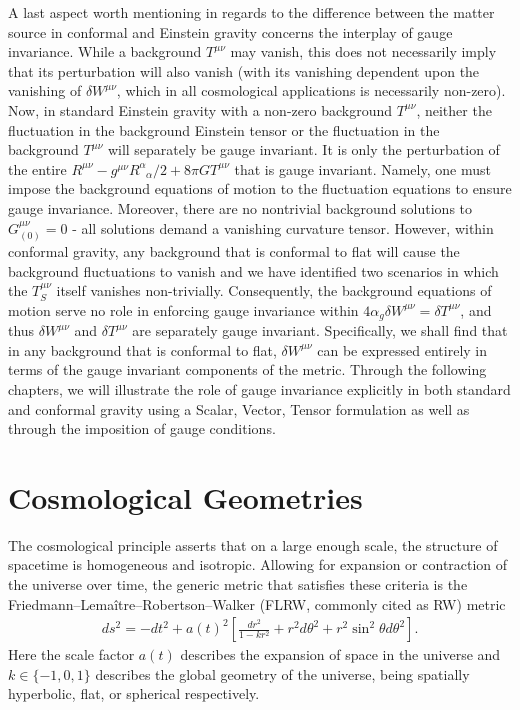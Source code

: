 A last aspect worth mentioning in regards to the difference between the matter source in conformal and Einstein gravity concerns the interplay of gauge invariance. While a background $T^{\mu\nu}$ may vanish, this does not necessarily imply that its perturbation will also vanish (with its vanishing dependent upon the vanishing of $\delta W^{\mu\nu}$, which in all cosmological applications is necessarily non-zero). Now, in standard Einstein gravity with a non-zero background $T^{\mu\nu}$, neither the fluctuation in the background Einstein tensor or the fluctuation in the background $T^{\mu\nu}$ will separately be gauge invariant. It is only the perturbation of the entire $R^{\mu\nu} -g^{\mu\nu}R^{\alpha}_{\phantom{\alpha}\alpha}/2+8\pi GT^{\mu\nu}$ that is gauge invariant. Namely, one must impose the background equations of motion to the fluctuation equations to ensure gauge invariance. Moreover, there are no nontrivial background solutions to $G^{\mu\nu}_{(0)}=0$ - all solutions demand a vanishing curvature tensor. However, within conformal gravity, any background that is conformal to flat will cause the background fluctuations to vanish and we have identified two scenarios in which the $T^{\mu\nu}_S$ itself vanishes non-trivially. Consequently, the background equations of motion serve no role in enforcing gauge invariance within $4\alpha_g\delta W^{\mu\nu} = \delta T^{\mu\nu}$, and thus $\delta W^{\mu\nu}$ and $\delta T^{\mu\nu}$ are separately gauge invariant.  Specifically, we shall find that in any background that is conformal to flat, $\delta W^{\mu\nu}$ can be expressed entirely in terms of the gauge invariant components of the metric. Through the following chapters, we will illustrate the role of gauge invariance explicitly in both standard and conformal gravity using a Scalar, Vector, Tensor formulation as well as through the imposition of gauge conditions.

\section{Cosmological Geometries}
\label{s:cosmological_geometries}
The cosmological principle asserts that on a large enough scale, the structure of spacetime is homogeneous and isotropic. Allowing for expansion or contraction of the universe over time, the generic metric that satisfies these criteria is the Friedmann–Lemaître–Robertson–Walker (FLRW, commonly cited as RW) \cite{kodama_sasaki_1984} metric
\begin{eqnarray}
ds^2 = -dt^2 + a(t)^2\left[ \frac{dr^2}{1-kr^2} + r^2d\theta^2 + r^2\sin^2\theta d\theta^2\right]. 
\label{FRLW}
\end{eqnarray}
Here the scale factor $a(t)$ describes the expansion of space in the universe and $k \in \{-1,0,1\}$ describes the global geometry of the universe, being spatially hyperbolic, flat, or spherical respectively. 

